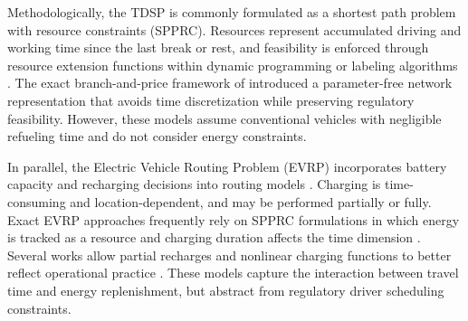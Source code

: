 \documentclass[3p,11pt,authoryear]{elsarticle}  %
\begin{document}
Methodologically, the TDSP is commonly formulated as a shortest path problem with resource constraints (SPPRC). Resources represent accumulated driving and working time since the last break or rest, and feasibility is enforced through resource extension functions within dynamic programming or labeling algorithms \citep{goel2010truck, drexl2010labelling}. The exact branch-and-price framework of \citet{goel2017exact} introduced a parameter-free network representation that avoids time discretization while preserving regulatory feasibility. However, these models assume conventional vehicles with negligible refueling time and do not consider energy constraints.


In parallel, the Electric Vehicle Routing Problem (EVRP) incorporates battery capacity and recharging decisions into routing models \citet{schneider2014electric}. Charging is time-consuming and location-dependent, and may be performed partially or fully. Exact EVRP approaches frequently rely on SPPRC formulations in which energy is tracked as a resource and charging duration affects the time dimension \citep{desaulniers2016exact, lam2022branch}. Several works allow partial recharges and nonlinear charging functions to better reflect operational practice \citep{montoya2017electric, froger2019improved}. These models capture the interaction between travel time and energy replenishment, but abstract from regulatory driver scheduling constraints.
\end{document}
